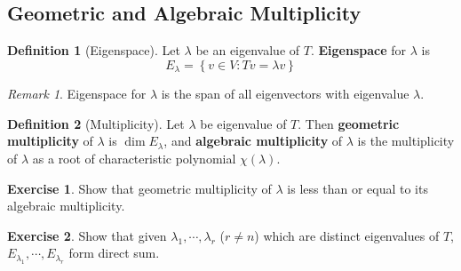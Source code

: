 \documentclass[12pt, a4paper]{article}
\theoremstyle{remark}
\newtheorem{remark}{Remark}
\theoremstyle{definition}
\newtheorem{definition}{Definition}
\newtheorem{exercise}{Exercise}
\numberwithin{equation}{section}
\numberwithin{definition}{section}
\numberwithin{example}{section}
\numberwithin{exercise}{section}
\numberwithin{remark}{section}
\numberwithin{figure}{section}
\begin{document}
\subsection{Geometric and Algebraic Multiplicity}
\begin{definition}[Eigenspace]
    Let $\lambda$ be an eigenvalue of $T$.
    \textbf{Eigenspace} for $\lambda$ is
    \begin{equation*}
        E_{\lambda} = \left\{ v \in V : Tv = \lambda v \right\}
    \end{equation*}
\end{definition}
\begin{remark}
    Eigenspace for $\lambda$ is the span of all eigenvectors with eigenvalue $\lambda$.
\end{remark}
\begin{definition}[Multiplicity]
    Let $\lambda$ be eigenvalue of $T$.
    Then \textbf{geometric multiplicity} of $\lambda$ is $\dim E_{\lambda}$,
    and \textbf{algebraic multiplicity} of $\lambda$ is the multiplicity of $\lambda$ as a root of characteristic polynomial $\chi \left( \lambda \right)$.
\end{definition}
\begin{exercise}
    Show that geometric multiplicity of $\lambda$ is less than or equal to its algebraic multiplicity.
\end{exercise}
\begin{exercise}
    Show that given $\lambda_1, \cdots, \lambda_r$ ($r \neq n$) which are distinct eigenvalues of $T$,
    $E_{\lambda_1}, \cdots, E_{\lambda_r}$ form direct sum.
\end{exercise}
\end{document}
